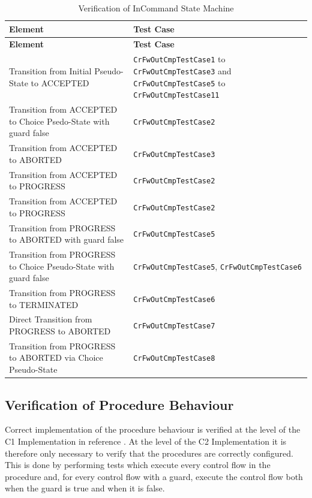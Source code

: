 \documentclass[a4paper,10pt]{article}
\begin{document}
\begin{longtable}{|>{\raggedright}p{6.0cm}|P{5.0cm}|}
\caption{Verification of InCommand State Machine}
\label{tab:verInCmdSM}\\
\hline
{}
\textbf{Element} & \textbf{Test Case} \\
\hline
\endfirsthead
{}
\textbf{Element} & \textbf{Test Case} \\
\hline
\endhead
Transition from Initial Pseudo-State to ACCEPTED  & \texttt{CrFwOutCmpTestCase1} to \texttt{CrFwOutCmpTestCase3} and \texttt{CrFwOutCmpTestCase5} to \texttt{CrFwOutCmpTestCase11} \\
\hline
Transition from ACCEPTED to Choice Psedo-State with guard false & \texttt{CrFwOutCmpTestCase2}\\
\hline
Transition from ACCEPTED to ABORTED & \texttt{CrFwOutCmpTestCase3}\\
\hline
Transition from ACCEPTED to PROGRESS & \texttt{CrFwOutCmpTestCase2}\\
\hline
Transition from ACCEPTED to PROGRESS & \texttt{CrFwOutCmpTestCase2}\\
\hline
Transition from PROGRESS to ABORTED with guard false & \texttt{CrFwOutCmpTestCase5}\\
\hline
Transition from PROGRESS to Choice Pseudo-State with guard false & \texttt{CrFwOutCmpTestCase5}, \texttt{CrFwOutCmpTestCase6}\\
\hline
Transition from PROGRESS to TERMINATED & \texttt{CrFwOutCmpTestCase6}\\
\hline
Direct Transition from PROGRESS to ABORTED & \texttt{CrFwOutCmpTestCase7}\\
\hline
Transition from PROGRESS to ABORTED via Choice Pseudo-State & \texttt{CrFwOutCmpTestCase8}\\
\hline
\end{longtable}

\subsection{Verification of Procedure Behaviour}
Correct implementation of the procedure behaviour is verified at the level of the C1 Implementation in reference \cite{ref:C1UserReq}. At the level of the C2 Implementation it is therefore only necessary to verify that the procedures are correctly configured. This is done by performing tests which execute every control flow in the procedure and, for every control flow with a guard, execute the control flow both when the guard is true and when it is false.
\end{document}

